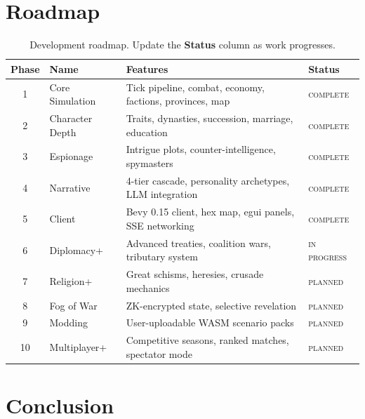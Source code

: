 \documentclass[a4paper, 11pt]{article}
\begin{document}
\section{Roadmap}
\label{sec:roadmap}

\begin{table}[htbp]
\centering
\caption{Development roadmap. Update the \textbf{Status} column as work progresses.}
\label{tab:roadmap}
\begin{tabular}{@{}clp{5.5cm}l@{}}
\toprule
\textbf{Phase} & \textbf{Name} & \textbf{Features} & \textbf{Status} \\
\midrule
1 & Core Simulation    & Tick pipeline, combat, economy, factions, provinces, map & \textsc{complete} \\
2 & Character Depth    & Traits, dynasties, succession, marriage, education & \textsc{complete} \\
3 & Espionage          & Intrigue plots, counter-intelligence, spymasters & \textsc{complete} \\
4 & Narrative          & 4-tier cascade, personality archetypes, LLM integration & \textsc{complete} \\
5 & Client             & Bevy 0.15 client, hex map, egui panels, SSE networking & \textsc{complete} \\
6 & Diplomacy+         & Advanced treaties, coalition wars, tributary system & \textsc{in progress} \\
7 & Religion+          & Great schisms, heresies, crusade mechanics & \textsc{planned} \\
8 & Fog of War         & ZK-encrypted state, selective revelation & \textsc{planned} \\
9 & Modding            & User-uploadable WASM scenario packs & \textsc{planned} \\
10 & Multiplayer+      & Competitive seasons, ranked matches, spectator mode & \textsc{planned} \\
\bottomrule
\end{tabular}
\end{table}


\section{Conclusion}
\label{sec:conclusion}
\end{document}
